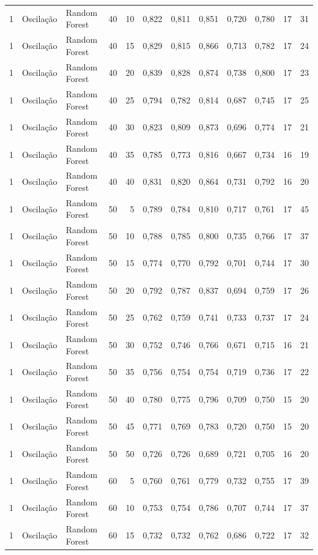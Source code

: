 \begin{longtable}{@{}rllrrrrrrrrr@{}}
1 & Oscilação & Random Forest & 40 & 10 & 0,822 & 0,811 & 0,851 & 0,720 & 0,780 & 17 & 31 \\
1 & Oscilação & Random Forest & 40 & 15 & 0,829 & 0,815 & 0,866 & 0,713 & 0,782 & 17 & 24 \\
1 & Oscilação & Random Forest & 40 & 20 & 0,839 & 0,828 & 0,874 & 0,738 & 0,800 & 17 & 23 \\
1 & Oscilação & Random Forest & 40 & 25 & 0,794 & 0,782 & 0,814 & 0,687 & 0,745 & 17 & 25 \\
1 & Oscilação & Random Forest & 40 & 30 & 0,823 & 0,809 & 0,873 & 0,696 & 0,774 & 17 & 21 \\
1 & Oscilação & Random Forest & 40 & 35 & 0,785 & 0,773 & 0,816 & 0,667 & 0,734 & 16 & 19 \\
1 & Oscilação & Random Forest & 40 & 40 & 0,831 & 0,820 & 0,864 & 0,731 & 0,792 & 16 & 20 \\
1 & Oscilação & Random Forest & 50 & 5 & 0,789 & 0,784 & 0,810 & 0,717 & 0,761 & 17 & 45 \\
1 & Oscilação & Random Forest & 50 & 10 & 0,788 & 0,785 & 0,800 & 0,735 & 0,766 & 17 & 37 \\
1 & Oscilação & Random Forest & 50 & 15 & 0,774 & 0,770 & 0,792 & 0,701 & 0,744 & 17 & 30 \\
1 & Oscilação & Random Forest & 50 & 20 & 0,792 & 0,787 & 0,837 & 0,694 & 0,759 & 17 & 26 \\
1 & Oscilação & Random Forest & 50 & 25 & 0,762 & 0,759 & 0,741 & 0,733 & 0,737 & 17 & 24 \\
1 & Oscilação & Random Forest & 50 & 30 & 0,752 & 0,746 & 0,766 & 0,671 & 0,715 & 16 & 21 \\
1 & Oscilação & Random Forest & 50 & 35 & 0,756 & 0,754 & 0,754 & 0,719 & 0,736 & 17 & 22 \\
1 & Oscilação & Random Forest & 50 & 40 & 0,780 & 0,775 & 0,796 & 0,709 & 0,750 & 15 & 20 \\
1 & Oscilação & Random Forest & 50 & 45 & 0,771 & 0,769 & 0,783 & 0,720 & 0,750 & 15 & 20 \\
1 & Oscilação & Random Forest & 50 & 50 & 0,726 & 0,726 & 0,689 & 0,721 & 0,705 & 16 & 20 \\
1 & Oscilação & Random Forest & 60 & 5 & 0,760 & 0,761 & 0,779 & 0,732 & 0,755 & 17 & 39 \\
1 & Oscilação & Random Forest & 60 & 10 & 0,753 & 0,754 & 0,786 & 0,707 & 0,744 & 17 & 37 \\
1 & Oscilação & Random Forest & 60 & 15 & 0,732 & 0,732 & 0,762 & 0,686 & 0,722 & 17 & 32 \\

\end{longtable}
